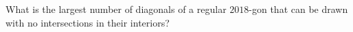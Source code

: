 What is the largest number of diagonals of a regular $2018$-gon that can be drawn with no intersections in their interiors?

